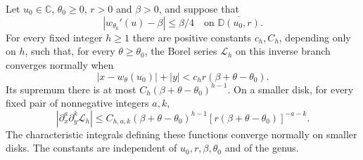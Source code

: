 \begin{lmm}\label{lmm:b:regular-disk}
Let $u_0\in\mathbb C$, $\theta_0\geq0$, $r>0$ and $\beta>0$,
and suppose that
\begin{equation}\label{eq:b:regular-hypothesis}
 |w_{\theta_0}'(u)-\beta|\leq\beta/4
                  \quad\text{on }\overline{\mathbb D(u_0,r)}.
\end{equation}
For every fixed integer $h\geq1$ there are positive constants
$c_h,C_h$, depending only on $h$, such that, for every
$\theta\geq\theta_0$, the Borel series $\mathcal L_h$ on this
inverse branch converges normally when
\begin{equation}\label{eq:b:regular-disk}
 |x-w_\theta(u_0)|+|y|
                  <c_h r(\beta+\theta-\theta_0).
\end{equation}
Its supremum there is at most
$C_h(\beta+\theta-\theta_0)^{h-1}$. On a smaller disk, for every
fixed pair of nonnegative integers $a,k$,
\begin{equation}\label{eq:b:regular-derivatives}
 |\partial_x^a\partial_y^k\mathcal L_h|
 \leq C_{h,a,k}(\beta+\theta-\theta_0)^{h-1}
                  [r(\beta+\theta-\theta_0)]^{-a-k}.
\end{equation}
The characteristic integrals defining these functions converge
normally on smaller disks. The constants are independent of
$u_0,r,\beta,\theta_0$ and of the genus.
\end{lmm}
